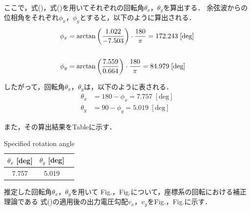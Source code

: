 ここで，式()，式()を用いてそれぞれの回転角$\theta_x$，$\theta_y$を算出する．
余弦波からの位相角をそれぞれ$\phi_x$，$\phi_y$とすると，以下のように算出される．
\begin{align}
  \phi_x & = \arctan \left(\frac{1.022}{-7.503}\right) \cdot \frac{180}{\pi} = 172.243\; [\mathrm{deg}] \\
  \notag                                                                                                \\
  \phi_y & = \arctan \left(\frac{7.559}{0.664}\right) \cdot \frac{180}{\pi} = 84.979\; [\mathrm{deg}]
\end{align}

したがって，回転角$\theta_x$，$\theta_y$は，以下のように表される．
\begin{align}
  \theta_x & = 180 - \phi_x = 7.757 \; [\mathrm{deg}] \\
  \theta_y & = 90 - \phi_y = 5.019 \; [\mathrm{deg}]
\end{align}

また，その算出結果をTableに示す．

\begin{table}[htbp]
  \begin{center}
    \caption{Specified rotation angle}
    \begin{tabular}{|p{30mm}|p{20mm}|p{20mm}|}
      \hline
      \multicolumn{1}{|c|}{$\theta_x$ [deg]} & \multicolumn{1}{|c|}{$\theta_y$ [deg]} \\ \hline
      \multicolumn{1}{|c|}{7.757}            & \multicolumn{1}{|c|}{5.019}            \\ \hline
    \end{tabular}
  \end{center}
\end{table}

\newpage
推定した回転角$\theta_x$，$\theta_y$を用いて
Fig.，Fig.について，座標系の回転における補正理論である
式()の適用後の出力電圧勾配$v_x$，$v_y$をFig.，Fig.に示す．

